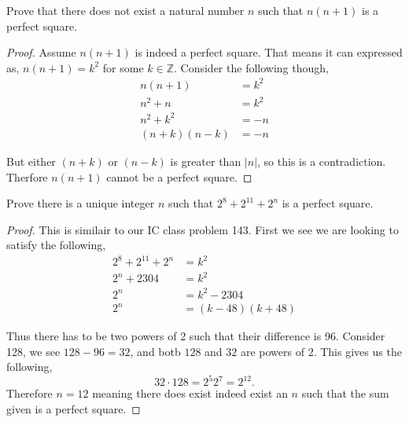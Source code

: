 \documentclass[11pt]{article}
\newenvironment{problem}[2][Problem\!]{\begin{trivlist}
\item[\hskip \labelsep {\bfseries #1}\hskip \labelsep {\bfseries #2}]}{\end{trivlist}}
\newcommand{\zz}{\mathbb Z}   %
\newcommand{\abs}[1]{\left\lvert#1\right\rvert} %
\begin{document}
\begin{tcolorbox}
    \begin{problem} {OC | 11/10 | 88.}
        Prove that there does not exist a natural number $n$ such that $n(n+1)$ is a perfect square.
    \end{problem}
\end{tcolorbox}
\begin{proof}
    Assume $n(n+1)$ is indeed a perfect square. That means it can expressed as, $n(n+1)= k^{2}$ for some $k \in \zz$. Consider the following though,
    \begin{align*}
        n(n+1) &= k^{2} \\
        n^{2} + n &= k^{2} \\
        n^{2} + k^{2} &= -n \\
        (n+k)(n-k) &= -n
    \end{align*}

    But either $(n+k)$ or $(n-k)$ is greater than $\abs{n}$, so this is a contradiction. Therfore $n(n+1)$ cannot be a perfect square. 
\end{proof}

\begin{tcolorbox}
    \begin{problem} {OC | 11/12 | 90.}
        Prove there is a unique integer $n$ such that $2^{8} + 2^{11} + 2^{n}$ is a perfect square.
    \end{problem}
\end{tcolorbox}
\begin{proof}
    This is similair to our IC class problem 143. First we see we are looking to satisfy the following,
    \begin{align*}
        2^{8} + 2^{11} + 2^{n} &= k^{2} \\
        2^{n} + 2304 &= k^{2} \\
        2^{n} &= k^{2} - 2304 \\
        2^{n} &= (k - 48)(k+48)
    \end{align*}

    Thus there has to be two powers of 2 such that their difference is 96. Consider 128, we see $128-96 = 32$, and botb $128$ and $32$ are powers of 2. This gives us the following,
    \[32 \cdot 128 = 2^{5} 2^{7} = 2^{12}.\]
    Therefore $n =12$ meaning there does exist indeed exist an $n$ such that the sum given is a perfect square.
\end{proof}
\end{document}
